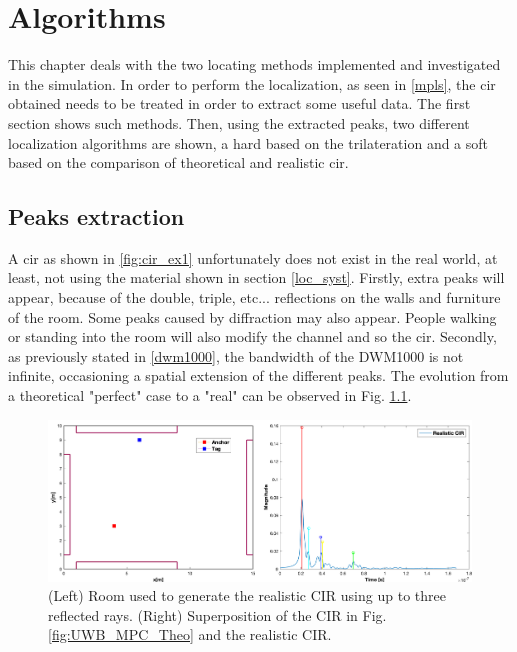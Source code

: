 \chapter{Algorithms}
\label{algos}

This chapter deals with the two locating methods implemented and investigated in the simulation. In order to perform the localization, as seen in \ref{mpls}, the \gls{cir} obtained needs to be treated in order to extract some useful data. The first section shows such methods. Then, using the extracted peaks, two different localization algorithms are shown, a hard based on the trilateration and a soft based on the comparison of theoretical and realistic \gls{cir}.

\section{Peaks extraction}

A \gls{cir} as shown in \ref{fig:cir_ex1} unfortunately does not exist in the real world, at least, not using the material shown in section \ref{loc_syst}. Firstly, extra peaks will appear, because of the double, triple, etc...  reflections on the walls and furniture of the room. Some peaks caused by diffraction may also appear. People walking or standing into the room will also modify the channel and so the \gls{cir}. Secondly, as previously stated in \ref{dwm1000}, the bandwidth of the DWM1000 is not infinite, occasioning a spatial extension of the different peaks. The evolution from a theoretical "perfect" case to a "real" can be observed in Fig. \ref{fig:peaks_real}.

\begin{figure}[H]
\centering
\includegraphics[width=\linewidth]{Images/cir_theo_real.png}
\caption{(Left) Room used to generate the realistic CIR using up to three reflected rays. (Right) Superposition of the CIR in Fig. \ref{fig:UWB_MPC_Theo} and the realistic CIR. \label{fig:peaks_real}}
\end{figure}

